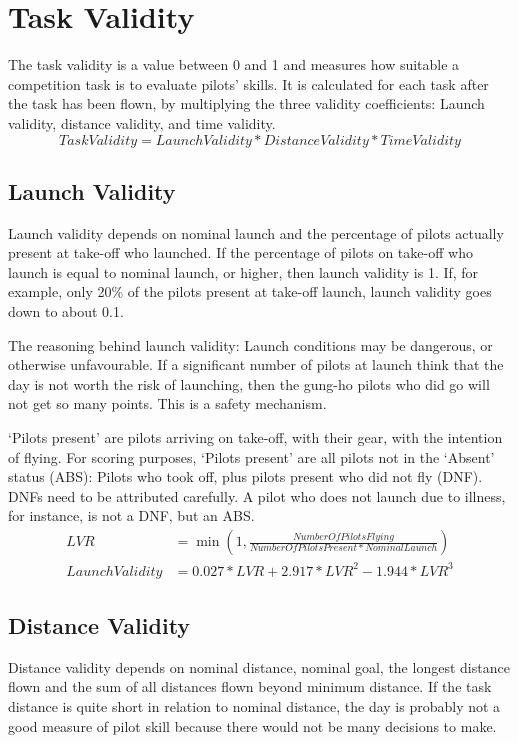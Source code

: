 \documentclass{article}
\begin{document}
\newpage
\section{Task Validity}
The task validity is a value between 0 and 1 and measures how suitable a competition task is to evaluate
pilots’ skills. It is calculated for each task after the task has been flown, by multiplying the three validity
coefficients: Launch validity, distance validity, and time validity.
\begin{equation*}
    TaskValidity = LaunchValidity * DistanceValidity * TimeValidity
\end{equation*}

\subsection{Launch Validity}
Launch validity depends on nominal launch and the percentage of pilots actually present at take-off who
launched. If the percentage of pilots on take-off who launch is equal to nominal launch, or higher, then
launch validity is 1. If, for example, only 20\% of the pilots present at take-off launch, launch validity goes
down to about 0.1.

The reasoning behind launch validity: Launch conditions may be dangerous, or otherwise unfavourable.
If a significant number of pilots at launch think that the day is not worth the risk of launching, then the
gung-ho pilots who did go will not get so many points. This is a safety mechanism.

‘Pilots present’ are pilots arriving on take-off, with their gear, with the intention of flying. For scoring
purposes, ‘Pilots present’ are all pilots not in the ‘Absent’ status (ABS): Pilots who took off, plus pilots
present who did not fly (DNF). DNFs need to be attributed carefully. A pilot who does not launch due to
illness, for instance, is not a DNF, but an ABS.
\begin{align*}
    LVR &= \min(1, \frac{NumberOfPilotsFlying}{NumberOfPilotsPresent * NominalLaunch}) \\
    LaunchValidity &= 0.027 * LVR + 2.917 * LVR^2 - 1.944 * LVR^3
\end{align*}

\subsection{Distance Validity}
Distance validity depends on nominal distance, nominal goal, the longest distance flown and the sum of
all distances flown beyond minimum distance. If the task distance is quite short in relation to nominal
distance, the day is probably not a good measure of pilot skill because there would not be many
decisions to make.
\end{document}
